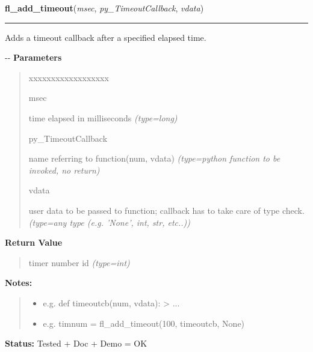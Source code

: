 \hspace{.8\funcindent}\begin{boxedminipage}{\funcwidth}

    \raggedright \textbf{fl\_add\_timeout}(\textit{msec}, \textit{py\_TimeoutCallback}, \textit{vdata})

    \vspace{-1.5ex}

    \rule{\textwidth}{0.5\fboxrule}
\setlength{\parskip}{2ex}

Adds a timeout callback after a specified elapsed time.

-{}-
\setlength{\parskip}{1ex}
      \textbf{Parameters}
      \vspace{-1ex}

      \begin{quote}
        \begin{Ventry}{xxxxxxxxxxxxxxxxxx}

          \item[msec]


time elapsed in milliseconds
            {\it (type=long)}

          \item[py\_TimeoutCallback]


name referring to function(num, vdata)
            {\it (type=python function to be invoked, no return)}

          \item[vdata]


user data to be passed to function; callback has to take care of
type check.
            {\it (type=any type (e.g. 'None', int, str, etc..))}

        \end{Ventry}

      \end{quote}

      \textbf{Return Value}
    \vspace{-1ex}

      \begin{quote}

timer number id
      {\it (type=int)}

      \end{quote}

\textbf{Notes:}
\begin{quote}
  \begin{itemize}

  \item
    \setlength{\parskip}{0.6ex}

e.g. def timeoutcb(num, vdata): > ...


  \item 
e.g. timnum = fl\_add\_timeout(100, timeoutcb, None)


\end{itemize}

\end{quote}

\textbf{Status:} 
Tested + Doc + Demo = OK


    \end{boxedminipage}

